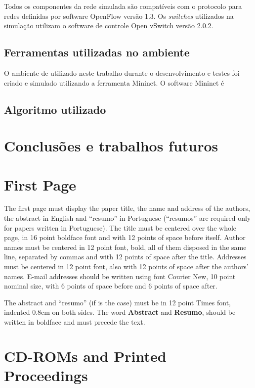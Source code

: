 \documentclass[12pt]{article}
\begin{document}
Todos os componentes da rede simulada são compatíveis com o protocolo para redes definidas por software OpenFlow versão 1.3. Os \emph{switches} utilizados na simulação utilizam o software de controle Open vSwitch versão 2.0.2.

\subsection{Ferramentas utilizadas no ambiente}
O ambiente de utilizado neste trabalho durante o desenvolvimento e testes foi criado e simulado utilizando a ferramenta Mininet. O software Mininet é 

\subsection{Algoritmo utilizado}



\section{Conclusões e trabalhos futuros}

\section{First Page} \label{sec:firstpage}

The first page must display the paper title, the name and address of the
authors, the abstract in English and ``resumo'' in Portuguese (``resumos'' are
required only for papers written in Portuguese). The title must be centered
over the whole page, in 16 point boldface font and with 12 points of space
before itself. Author names must be centered in 12 point font, bold, all of
them disposed in the same line, separated by commas and with 12 points of
space after the title. Addresses must be centered in 12 point font, also with
12 points of space after the authors' names. E-mail addresses should be
written using font Courier New, 10 point nominal size, with 6 points of space
before and 6 points of space after.

The abstract and ``resumo'' (if is the case) must be in 12 point Times font,
indented 0.8cm on both sides. The word \textbf{Abstract} and \textbf{Resumo},
should be written in boldface and must precede the text.

\section{CD-ROMs and Printed Proceedings}
\end{document}
